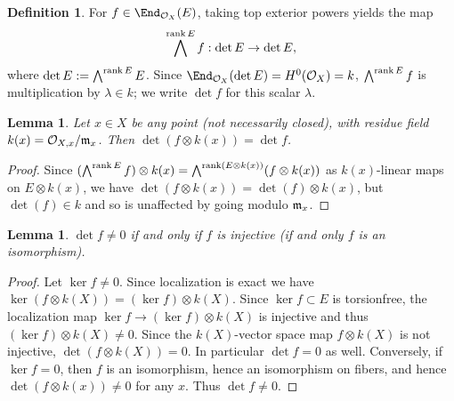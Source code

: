 \documentclass[12pt]{article}
\def\OO{\mathcal O}
\theoremstyle{theorem}
\numberwithin{thm}{section}
\newtheorem{lem}[thm]{Lemma}
\theoremstyle{definition}
\newtheorem{dfn}[thm]{Definition}
\begin{document}


\begin{dfn}
  For $f\in \End_{\OO_X}(E)$, taking top exterior powers yields the map
  $$ \bigwedge^{\operatorname{rank} E} f: \det E  \to \det E, $$
  where $\det E := \bigwedge^{\operatorname{rank} E} E$.
  Since $\End_{\OO_X}(\det E) = H^0(\OO_X)=k$, $\bigwedge^{\operatorname{rank} E} f$ is multiplication by $\lambda\in k$; we write $\det f$ for this scalar $\lambda$.
\end{dfn}

\begin{lem}
  Let $x \in X$ be any point (not necessarily closed), with residue field $k(x) = \OO_{X,x}/\m_x$. Then $\det(f\otimes k(x)) =\det f$.
\end{lem}

\begin{proof}
  Since $(\bigwedge^{\operatorname{rank} E} f)\otimes k(x) = \bigwedge^{\operatorname{rank}( E\otimes k(x))}( f\otimes k(x))$ as $k(x)$-linear maps on $E\otimes k(x)$,
  we have $\det(f\otimes k(x)) =\det(f)\otimes k(x)$, but $\det(f)\in k$ and so is unaffected by going modulo $\mathfrak m_x$.
\end{proof}



\begin{lem}
  $\det f \neq 0 $ if and only if $f$ is injective (if and only $f$ is an isomorphism).
\end{lem}

\begin{proof}
  Let $\ker f \neq 0$. Since localization is exact
  we have
  $\ker(f\otimes k(X)) = (\ker f)\otimes k(X)$.
  Since $\ker f \subset E$ is torsionfree, the localization map $\ker f \to (\ker f)\otimes k(X)$ is injective and thus $(\ker f) \otimes k(X)\neq 0$.
  Since the $k(X)$-vector space map $f\otimes k(X)$ is not injective, $\det(f\otimes k(X))= 0$.
  In particular  $\det f = 0$ as well.
  Conversely,
  if $\ker f = 0$, then
  $f$ is an isomorphism, hence an isomorphism on fibers, and hence
  $\det(f\otimes k(x)) \neq 0$ for any $x$. Thus $\det f\neq 0$.
\end{proof}
\end{document}
